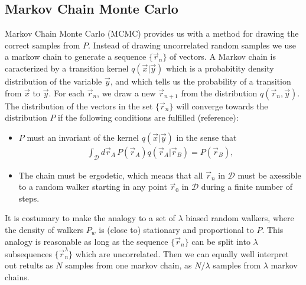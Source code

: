 \documentclass[a4paper,10pt,twocolumn]{article} %
\begin{document}
\subsection{Markov Chain Monte Carlo}%

Markov Chain Monte Carlo (MCMC) provides us with a method for drawing the correct samples from $P$. 
Instead of drawing uncorrelated random samples we use a markow chain to generate a sequence $\{\vec r_n\}$ of vectors.
A Markov chain is caracterized by a transition kernel $q(\vec x|\vec y)$ which is a probabitity density distribution 
of the variable $\vec y$, and which tells us the probability of a transition from $\vec x$ to $\vec y$.
For each $\vec r_n$, we draw a new $\vec r_{n+1}$ from the distribution $q(\vec r_n,\vec y)$. The distribution 
of the vectors in the set 
$\{\vec r_n\}$ will converge towards the distribution $P$ if the following 
conditions are fulfilled (reference):
\begin{itemize}
\item
	$P$ must an invariant of the kernel $q(\vec x|\vec y)$ in the sense that 
	\begin{align}
	\int_{\mathcal D} d\vec r_A\, P(\vec r_A) q(\vec r_A | \vec r_B) = P(\vec r_B) \label{eq221},
	\end{align}
\item
	The chain must be ergodetic, which means that all $\vec r_n$ in $\mathcal D$ must be axessible to a 
	random walker starting in any point $\vec r_0$ in $\mathcal D$ during a finite number of steps. 
\end{itemize}

%
%
It is costumary to make the analogy to a set of $\lambda$ biased random walkers, where
the density of walkers $P_w$ is (close to) stationary and proportional to $P$.
This analogy is reasonable as long as the sequence $\{\vec r_n\}$ can be split into $\lambda$ 
subsequences $\{\vec r_n^\lambda\}$ which are uncorrelated. Then we can equally well interpret out retults as $N$ samples
from one markov chain, as $N/\lambda$ samples from $\lambda$ markov chains.
\end{document}
